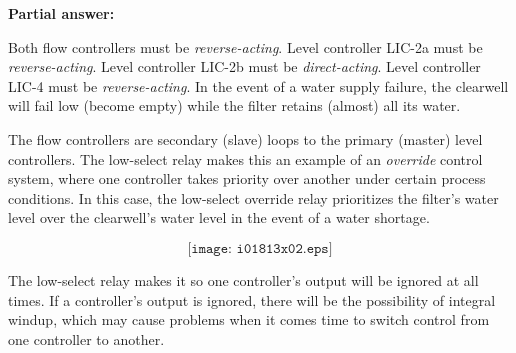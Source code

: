 
\noindent
{\bf Partial answer:}

\vskip 10pt

Both flow controllers must be {\it reverse-acting}.  Level controller LIC-2a must be {\it reverse-acting}.  Level controller LIC-2b must be {\it direct-acting}.  Level controller LIC-4 must be {\it reverse-acting}.  In the event of a water supply failure, the clearwell will fail low (become empty) while the filter retains (almost) all its water.







The flow controllers are secondary (slave) loops to the primary (master) level controllers.  The low-select relay makes this an example of an {\it override} control system, where one controller takes priority over another under certain process conditions.  In this case, the low-select override relay prioritizes the filter's water level over the clearwell's water level in the event of a water shortage.

$$\texttt{[image: i01813x02.eps]}$$

The low-select relay makes it so one controller's output will be ignored at all times.  If a controller's output is ignored, there will be the possibility of integral windup, which may cause problems when it comes time to switch control from one controller to another.




